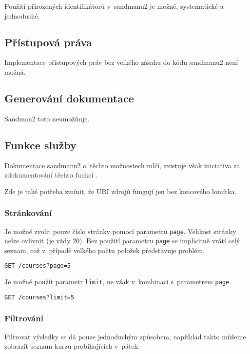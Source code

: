 Použití přirozených identifikátorů v~sandmanu2 je možné, systematické a jednoduché.

\subsection{Přístupová práva}\label{pux159uxedstupovuxe1-pruxe1va}

Implementace přístupových práv bez velkého zásahu do kódu sandmanu2 není možná.

\subsection{Generování dokumentace}\label{generovuxe1nuxed-dokumentace}

Sandman2 toto neumožňuje.

\subsection{Funkce služby}\label{funkce-sluux17eby}

Dokumentace sandmanu2 o~těchto možnostech mlčí, existuje však iniciativa za zdokumentování těchto funkcí \autocite{sandmanquery}.

Zde je také potřeba zmínit, že URI zdrojů fungují jen bez koncového lomítka.

\subsubsection*{Stránkování}\label{struxe1nkovuxe1nuxed}

Je možné zvolit pouze číslo stránky pomocí parametru \verb!page!. Velikost stránky nelze ovlivnit (je vždy 20). Bez použití parametru \verb!page! se implicitně vrátí celý seznam, což v~případě velkého počtu položek představuje problém.

\verb!GET /courses?page=5!

Je možné použít parametr \verb!limit!, ne však v~kombinaci s~parametrem \verb!page!.

\verb!GET /courses?limit=5!

\subsubsection*{Filtrování}\label{filtrovuxe1nuxed}

Filtrovat výsledky se dá pouze jednoduchým způsobem, například takto můžeme zobrazit seznam kurzů probíhajících v~pátek:


